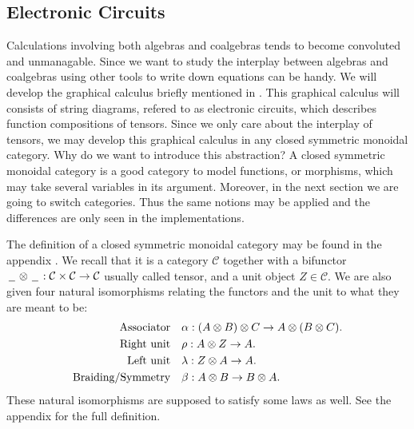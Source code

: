 \documentclass[../thesis.tex]{subfiles}
\begin{document}
    \subsection{Electronic Circuits}
            Calculations involving both algebras and coalgebras tends to become convoluted and unmanagable. Since we want to study the interplay between algebras and coalgebras using other tools to write down equations can be handy. We will develop the graphical calculus briefly mentioned in \cite{Loday12}. This graphical calculus will consists of string diagrams, refered to as electronic circuits, which describes function compositions of tensors. Since we only care about the interplay of tensors, we may develop this graphical calculus in any closed symmetric monoidal category. Why do we want to introduce this abstraction? A closed symmetric monoidal category is a good category to model functions, or morphisms, which may take several variables in its argument. Moreover, in the next section we are going to switch categories. Thus the same notions may be applied and the differences are only seen in the implementations.
            
            The definition of a closed symmetric monoidal category may be found in the appendix . We recall that it is a category $\mathcal{C}$ together with a bifunctor $\argument\otimes\argument : \mathcal{C}\times\mathcal{C}\rightarrow\mathcal{C}$ usually called tensor, and a unit object $Z\in \mathcal{C}$. We are also given four natural isomorphisms relating the functors and the unit to what they are meant to be:
            \begin{align*}
                \tt{Associator} & \quad \alpha : (A \otimes B) \otimes C \rightarrow A \otimes (B \otimes C)\tt{.}\\
                \tt{Right unit} & \quad \rho : A \otimes Z \rightarrow A\tt{.}\\
                \tt{Left unit} & \quad \lambda : Z \otimes A \rightarrow A\tt{.}\\
                \tt{Braiding/Symmetry} & \quad \beta : A \otimes B \rightarrow B \otimes A\tt{.}
            \end{align*}
            These natural isomorphisms are supposed to satisfy some laws as well. See the appendix for the full definition.
\end{document}
